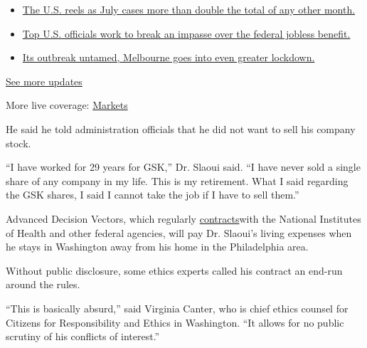 \begin{itemize}
\tightlist
\item
  \href{https://www.nytimes3xbfgragh.onion/2020/08/01/world/coronavirus-covid-19.html?action=click\&pgtype=Article\&state=default\&region=MAIN_CONTENT_1\&context=storylines_live_updates\#link-34047410}{The
  U.S. reels as July cases more than double the total of any other
  month.}
\item
  \href{https://www.nytimes3xbfgragh.onion/2020/08/01/world/coronavirus-covid-19.html?action=click\&pgtype=Article\&state=default\&region=MAIN_CONTENT_1\&context=storylines_live_updates\#link-780ec966}{Top
  U.S. officials work to break an impasse over the federal jobless
  benefit.}
\item
  \href{https://www.nytimes3xbfgragh.onion/2020/08/01/world/coronavirus-covid-19.html?action=click\&pgtype=Article\&state=default\&region=MAIN_CONTENT_1\&context=storylines_live_updates\#link-2bc8948}{Its
  outbreak untamed, Melbourne goes into even greater lockdown.}
\end{itemize}

\href{https://www.nytimes3xbfgragh.onion/2020/08/01/world/coronavirus-covid-19.html?action=click\&pgtype=Article\&state=default\&region=MAIN_CONTENT_1\&context=storylines_live_updates}{See
more updates}

More live coverage:
\href{https://www.nytimes3xbfgragh.onion/live/2020/07/31/business/stock-market-today-coronavirus?action=click\&pgtype=Article\&state=default\&region=MAIN_CONTENT_1\&context=storylines_live_updates}{Markets}

He said he told administration officials that he did not want to sell
his company stock.

``I have worked for 29 years for GSK,'' Dr. Slaoui said. ``I have never
sold a single share of any company in my life. This is my retirement.
What I said regarding the GSK shares, I said I cannot take the job if I
have to sell them.''

Advanced Decision Vectors, which regularly
\href{https://advancedvllc.com/clients/}{contracts}with the National
Institutes of Health and other federal agencies, will pay Dr. Slaoui's
living expenses when he stays in Washington away from his home in the
Philadelphia area.

Without public disclosure, some ethics experts called his contract an
end-run around the rules.

``This is basically absurd,'' said Virginia Canter, who is chief ethics
counsel for Citizens for Responsibility and Ethics in Washington. ``It
allows for no public scrutiny of his conflicts of interest.''

